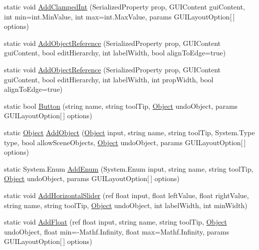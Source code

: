 \begin{DoxyCompactItemize}
\item 
static void \mbox{\hyperlink{class_root_motion_1_1_inspector_a61443f51860ed58be54639559912b50d}{Add\+Clamped\+Int}} (Serialized\+Property prop, G\+U\+I\+Content gui\+Content, int min=int.\+Min\+Value, int max=int.\+Max\+Value, params G\+U\+I\+Layout\+Option\mbox{[}$\,$\mbox{]} options)
\item 
static void \mbox{\hyperlink{class_root_motion_1_1_inspector_a403b9146e788460c20703b7727939a5b}{Add\+Object\+Reference}} (Serialized\+Property prop, G\+U\+I\+Content gui\+Content, bool edit\+Hierarchy, int label\+Width, bool align\+To\+Edge=true)
\item 
static void \mbox{\hyperlink{class_root_motion_1_1_inspector_ae43406ffdb66cf7d98106053019182a7}{Add\+Object\+Reference}} (Serialized\+Property prop, G\+U\+I\+Content gui\+Content, bool edit\+Hierarchy, int label\+Width, int prop\+Width, bool align\+To\+Edge=true)
\item 
static bool \mbox{\hyperlink{class_root_motion_1_1_inspector_aa7a4a02d9390a27d9df08d4ea5881933}{Button}} (string name, string tool\+Tip, \mbox{\hyperlink{_quads_8cs_aef19bab18b9814edeef255c43e4f6bbc}{Object}} undo\+Object, params G\+U\+I\+Layout\+Option\mbox{[}$\,$\mbox{]} options)
\item 
static \mbox{\hyperlink{_quads_8cs_aef19bab18b9814edeef255c43e4f6bbc}{Object}} \mbox{\hyperlink{class_root_motion_1_1_inspector_a6437d1e0566072580c22b4ef6def12d7}{Add\+Object}} (\mbox{\hyperlink{_quads_8cs_aef19bab18b9814edeef255c43e4f6bbc}{Object}} input, string name, string tool\+Tip, System.\+Type type, bool allow\+Scene\+Objects, \mbox{\hyperlink{_quads_8cs_aef19bab18b9814edeef255c43e4f6bbc}{Object}} undo\+Object, params G\+U\+I\+Layout\+Option\mbox{[}$\,$\mbox{]} options)
\item 
static System.\+Enum \mbox{\hyperlink{class_root_motion_1_1_inspector_afcbc550e7f3c44cfa75b3d654cca3ab6}{Add\+Enum}} (System.\+Enum input, string name, string tool\+Tip, \mbox{\hyperlink{_quads_8cs_aef19bab18b9814edeef255c43e4f6bbc}{Object}} undo\+Object, params G\+U\+I\+Layout\+Option\mbox{[}$\,$\mbox{]} options)
\item 
static void \mbox{\hyperlink{class_root_motion_1_1_inspector_ae97e87201fcfa1ef382b9f00e2c6cfce}{Add\+Horizontal\+Slider}} (ref float input, float left\+Value, float right\+Value, string name, string tool\+Tip, \mbox{\hyperlink{_quads_8cs_aef19bab18b9814edeef255c43e4f6bbc}{Object}} undo\+Object, int label\+Width, int min\+Width)
\item 
static void \mbox{\hyperlink{class_root_motion_1_1_inspector_a700893d4651ca702d745bbc97c253a45}{Add\+Float}} (ref float input, string name, string tool\+Tip, \mbox{\hyperlink{_quads_8cs_aef19bab18b9814edeef255c43e4f6bbc}{Object}} undo\+Object, float min=-\/Mathf.\+Infinity, float max=Mathf.\+Infinity, params G\+U\+I\+Layout\+Option\mbox{[}$\,$\mbox{]} options)

\end{DoxyCompactItemize}
